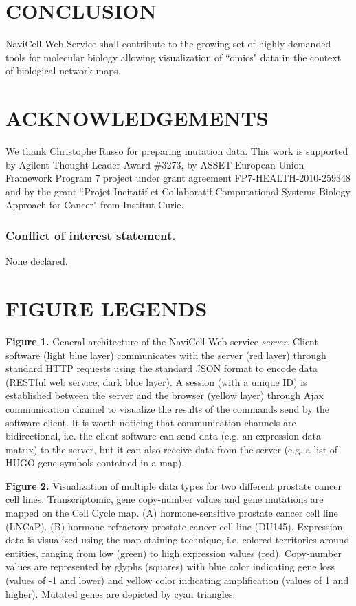 \documentclass[a4,center,fleqn]{NAR}
\begin{document}
\section{CONCLUSION}

NaviCell Web Service shall contribute to the growing set of highly demanded
tools for molecular biology allowing visualization of ``omics" data in the
context of biological network maps.

\section{ACKNOWLEDGEMENTS}

We thank Christophe Russo for preparing mutation data. This work is supported by Agilent Thought Leader Award \#3273, by ASSET
European Union Framework Program 7 project under grant agreement
FP7-HEALTH-2010-259348 and by the
grant ``Projet Incitatif et Collaboratif Computational Systems Biology Approach for Cancer" from Institut Curie.

\subsubsection{Conflict of interest statement.} None declared.

\section{FIGURE LEGENDS}

\textbf{Figure 1.} General architecture of the NaviCell Web service
\emph{server}. Client software (light blue layer) communicates with the server
(red layer) through standard HTTP requests using the standard JSON format to
encode data (RESTful web service, dark blue layer). A session (with a unique ID)
is established between the server and the browser (yellow layer) through
Ajax communication channel to visualize the results of the commands send by the
software client. It is worth noticing that communication channels are bidirectional, i.e.
the client software can send data (e.g. an expression data matrix) to the
server, but it can also receive data from the server (e.g. a list of HUGO
gene symbols contained in a map).

\textbf{Figure 2.} Visualization of multiple data types for two different
prostate cancer cell lines. Transcriptomic, gene copy-number values and gene
mutations \cite{barretina2012cancer} are mapped on the Cell Cycle map. (A)
hormone-sensitive prostate cancer cell line (LNCaP). (B) hormone-refractory
prostate cancer cell line (DU145). Expression data is visualized using the
map staining technique, i.e. colored territories around entities, ranging from
low  (green) to high expression values (red).  Copy-number values are
represented by glyphs (squares) with blue color indicating gene loss (values of
-1 and lower) and yellow color indicating amplification (values of 1 and
higher). Mutated genes are depicted by cyan triangles.
\end{document}
